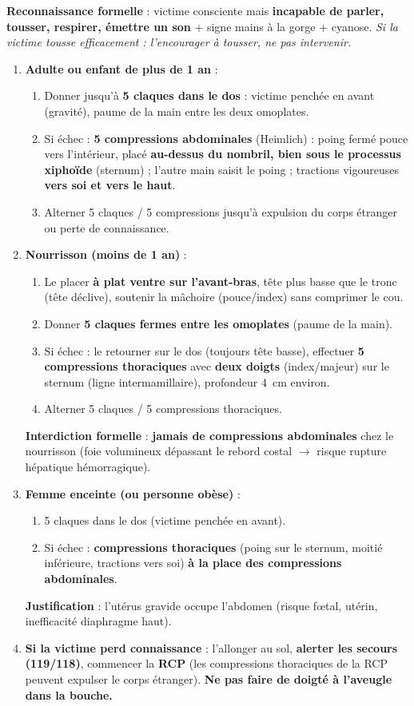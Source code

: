 \documentclass[11pt]{article}
\begin{document}
\begin{methode}
\textbf{Reconnaissance formelle} : victime consciente mais \textbf{incapable de parler, tousser, respirer, émettre un son} + signe mains à la gorge + cyanose. \emph{Si la victime tousse efficacement : l'encourager à tousser, ne pas intervenir.}
\begin{enumerate}
\item \textbf{Adulte ou enfant de plus de 1 an} :
\begin{enumerate}
\item Donner jusqu'à \textbf{5 claques dans le dos} : victime penchée en avant (gravité), paume de la main entre les deux omoplates.
\item Si échec : \textbf{5 compressions abdominales} (Heimlich) : poing fermé pouce vers l'intérieur, placé \textbf{au-dessus du nombril, bien sous le processus xiphoïde} (sternum) ; l'autre main saisit le poing ; tractions vigoureuses \textbf{vers soi et vers le haut}.
\item Alterner 5 claques / 5 compressions jusqu'à expulsion du corps étranger ou perte de connaissance.
\end{enumerate}
\item \textbf{Nourrisson (moins de 1 an)} :
\begin{enumerate}
\item Le placer \textbf{à plat ventre sur l'avant-bras}, tête plus basse que le tronc (tête déclive), soutenir la mâchoire (pouce/index) sans comprimer le cou.
\item Donner \textbf{5 claques fermes entre les omoplates} (paume de la main).
\item Si échec : le retourner sur le dos (toujours tête basse), effectuer \textbf{5 compressions thoraciques} avec \textbf{deux doigts} (index/majeur) sur le sternum (ligne intermamillaire), profondeur \SI{4}{cm} environ.
\item Alterner 5 claques / 5 compressions thoraciques.
\end{enumerate}
\textbf{Interdiction formelle} : \textbf{jamais de compressions abdominales} chez le nourrisson (foie volumineux dépassant le rebord costal $\rightarrow$ risque rupture hépatique hémorragique).
\item \textbf{Femme enceinte (ou personne obèse)} :
\begin{enumerate}
\item 5 claques dans le dos (victime penchée en avant).
\item Si échec : \textbf{compressions thoraciques} (poing sur le sternum, moitié inférieure, tractions vers soi) \textbf{à la place des compressions abdominales}.
\end{enumerate}
\textbf{Justification} : l'utérus gravide occupe l'abdomen (risque fœtal, utérin, inefficacité diaphragme haut).
\item \textbf{Si la victime perd connaissance} : l'allonger au sol, \textbf{alerter les secours (119/118)}, commencer la \textbf{RCP} (les compressions thoraciques de la RCP peuvent expulser le corps étranger). \textbf{Ne pas faire de doigté à l'aveugle dans la bouche.}
\end{enumerate}
\end{methode}
\end{document}
